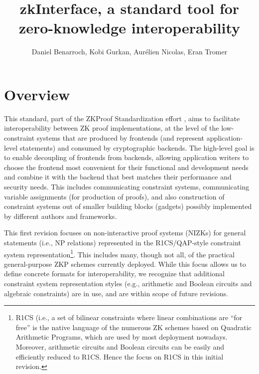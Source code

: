 \documentclass[a4paper,12pt]{article}
\title{zkInterface, a standard tool for zero-knowledge interoperability}
\author{Daniel Benarroch, Kobi Gurkan, Aurélien Nicolas, Eran Tromer}
\newcommand{\enote}[1]{\dtcolornote[Eran]{darkgreen}{#1}}
\begin{document}
		
		\maketitle
		 
\tableofcontents
\section{Overview}
This standard, part of the ZKProof Standardization effort \cite{ZKProofSecurity, ZKProofImplementation, ZKProofApplications}, aims to facilitate interoperability between ZK proof implementations, at the level of the low-constraint systems that are produced by frontends (and represent application-level statements) and consumed by cryptographic backends. The high-level goal is to enable decoupling of frontends from backends, allowing application writers to choose the frontend most convenient for their functional and development needs and combine it with the backend that best matches their performance and security needs. This includes communicating constraint systems, communicating variable assignments (for production of proofs), and also construction of constraint systems out of smaller building blocks (gadgets) possibly implemented by different authors and frameworks.

This first revision focuses on non-interactive proof systems (NIZKs) for general statements (i.e., NP relations) represented in the R1CS/QAP-style constraint system representation\footnote{R1CS (i.e., a set of bilinear constraints where linear combinations are ``for free'' is the native language of the numerous ZK schemes based on Quadratic Arithmetic Programs, which are used by most deployment nowadays. Moreover, arithmetic circuits and Boolean circuits can be easily and efficiently reduced to R1CS. Hence the focus on R1CS in this initial revision.}. This includes many, though not all, of the practical general-purpose ZKP schemes currently deployed. While this focus allows us to define concrete formats for interoperability, we recognize that additional constraint system representation styles (e.g., arithmetic and Boolean circuits and algebraic constraints) are in use, and are within scope of future revisions.
\end{document}
